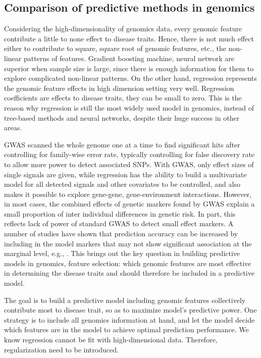 \subsection{Comparison of predictive methods in genomics}
Considering the high-dimensionality of genomics data, every genomic feature contribute a little to none effect to disease traits. Hence, there is not much effect either to contribute to square, square root of genomic features, etc., the non-linear patterns of features. Gradient boosting machine, neural network are superior when sample size is large, since there is enough information for them to explore complicated non-linear patterns. On the other hand, regression represents the genomic feature effects in high dimension setting very well. Regression coefficients are effects to disease traits, they can be small to zero. This is the reason why regression is still the most widely used model in genomics, instead of tree-based methods and neural networks, despite their huge success in other areas.

GWAS scanned the whole genome one at a time to find significant hits after controlling for family-wise error rate, typically controlling for false discovery rate to allow more power to detect associated SNPs. With GWAS, only effect sizes of single signals are given, while regression has the ability to build a multivariate model for all detected signals and other covariates to be controlled, and also makes it possible to explore gene-gene, gene-environment interactions. However, in most cases, the combined effects of genetic markers found by GWAS explain a small proportion of inter individual differences in genetic risk. In part, this reflects lack of power of standard GWAS to detect small effect markers. A number of studies have shown that prediction accuracy can be increased by including in the model markers that may not show significant association at the marginal level, e.g., \citep{allen2010hundreds}. This brings out the key question in building predictive models in genomics, feature selection: which genomic features are most effective in determining the disease traits and should therefore be included in a predictive model.

The goal is to build a predictive model including genomic features collectively contribute most to disease trait, so as to maximize model's predictive power. One strategy is to include all genomics information at hand, and let the model decide which features are in the model to achieve optimal prediction performance. We know regression cannot be fit with high-dimensional data. Therefore, regularization need to be introduced. 

